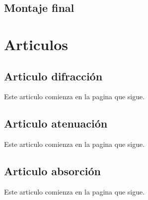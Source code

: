 \documentclass[12]{article}
\newenvironment{Figure}
{\par\medskip\noindent\minipage{\linewidth}}
{\endminipage\par\medskip}
\begin{document}
\subsection{Montaje final}
\begin{Figure}	
\center
{}
\label{fig:H}
\end{Figure}
\newpage
\section{Articulos}
\subsection{Articulo difracción}
Este articulo comienza en la pagina que sigue.

\subsection{Articulo atenuación}
Este articulo comienza en la pagina que sigue.

\subsection{Articulo absorción}
Este articulo comienza en la pagina que sigue.

\end{document}

